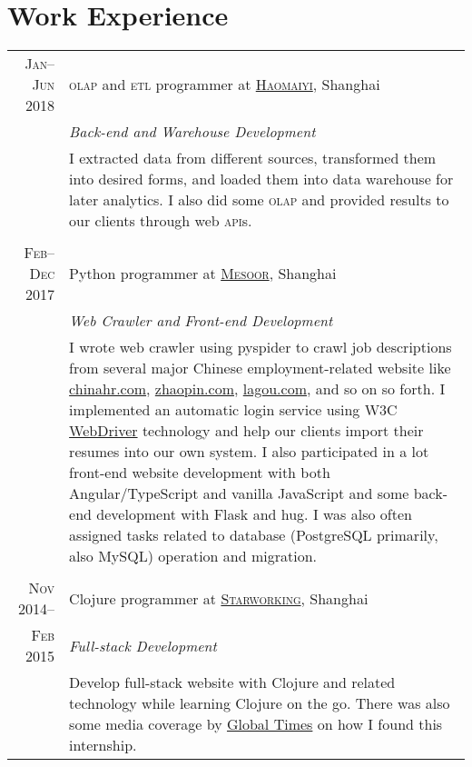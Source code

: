 \documentclass[a4paper,11pt]{article}
\begin{document}
\section{Work Experience}
\begin{tabularx}{.935\textwidth}{r|X}
  \textsc{Jan--Jun 2018} & \textsc{olap} and \textsc{etl} programmer at \href{https://www.haomaiyi.com/}{\textsc{Haomaiyi}}, Shanghai \\
                         & \emph{Back-end and Warehouse Development} \\
                         & \footnotesize I extracted data from different sources, transformed them into desired forms, and loaded them into data warehouse for later analytics.  I also did some \textsc{olap} and provided results to our clients through web \textsc{api}s.\\
  \multicolumn{2}{c}{} \\
  \textsc{Feb--Dec 2017} & Python programmer at \href{https://www.mesoor.com/}{\textsc{Mesoor}}, Shanghai \\
                         & \emph{Web Crawler and Front-end Development}\\
                         & \footnotesize I wrote web crawler using pyspider to crawl job descriptions from several major Chinese employment-related website like \href{http://www.chinahr.com/}{chinahr.com}, \href{https://www.zhaopin.com/}{zhaopin.com}, \href{https://www.lagou.com/}{lagou.com}, and so on so forth.  I implemented an automatic login service using W3C \href{https://github.com/w3c/web-platform-tests/pull/6743}{WebDriver} technology and help our clients import their resumes into our own system.  I also participated in a lot front-end website development with both Angular/TypeScript and vanilla JavaScript and some back-end development with Flask and hug.  I was also often assigned tasks related to database (PostgreSQL primarily, also MySQL) operation and migration.\\
  \multicolumn{2}{c}{} \\
  \textsc{Nov 2014--}    & Clojure programmer at \href{http://www.starworking.com/}{\textsc{Starworking}}, Shanghai \\
  \textsc{Feb 2015}      & \emph{Full-stack Development}\\
                         & \footnotesize Develop full-stack website with Clojure and related technology while learning Clojure on the go.  There was also some media coverage by \href{http://www.globaltimes.cn/content/871111.shtml}{Global Times} on how I found this internship.
\end{tabularx}
\end{document}
